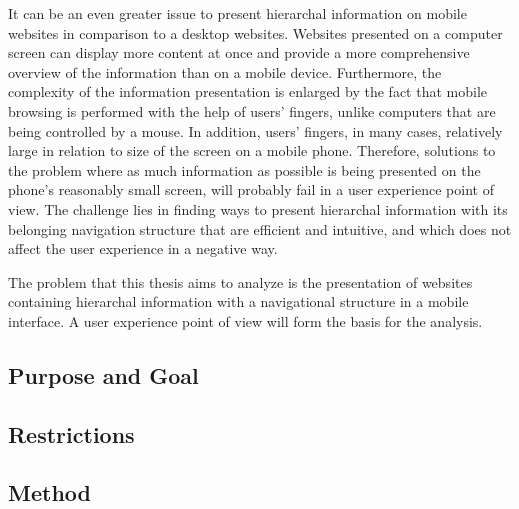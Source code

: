 It can be an even greater issue to present hierarchal information on mobile websites in comparison to a desktop websites. Websites presented on a computer screen can display more content at once and provide a more comprehensive overview of the information than on a mobile device. Furthermore, the complexity of the information presentation is enlarged by the fact that mobile browsing is performed with the help of users’ fingers, unlike computers that are being controlled by a mouse. In addition, users’ fingers, in many cases, relatively large in relation to size of the screen on a mobile phone. Therefore, solutions to the problem where as much information as possible is being presented on the phone's reasonably small screen, will probably fail in a user experience point of view. The challenge lies in finding ways to present hierarchal information with its belonging navigation structure that are efficient and intuitive, and which does not affect the user experience in a negative way. 

The problem that this thesis aims to analyze is the presentation of websites containing hierarchal information with a navigational structure in a mobile interface. A user experience point of view will form the basis for the analysis.
\subsection{Purpose and Goal}

\subsection{Restrictions}

\subsection{Method}
